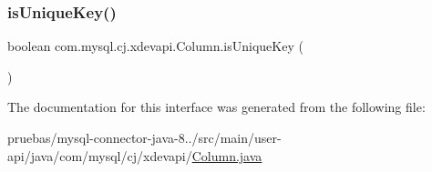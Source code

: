 \subsubsection{\texorpdfstring{is\+Unique\+Key()}{isUniqueKey()}}
{\footnotesize\ttfamily boolean com.\+mysql.\+cj.\+xdevapi.\+Column.\+is\+Unique\+Key (\begin{DoxyParamCaption}{ }\end{DoxyParamCaption})}



The documentation for this interface was generated from the following file\+:\begin{DoxyCompactItemize}
\item 
pruebas/mysql-\/connector-\/java-\/8../src/main/user-\/api/java/com/mysql/cj/xdevapi/\mbox{\hyperlink{_column_8java}{Column.\+java}}\end{DoxyCompactItemize}
